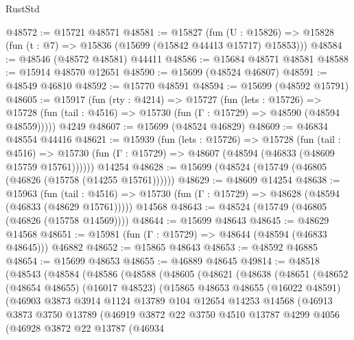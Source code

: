\begin{lexlean}{RustStd}
\begin{coremodule}
@48572 := @15721 @48571
@48581 := @15827
    (fun (U : @15826) => @15828 (fun (t : @7) => @15836 (@15699 (@15842 @44413 @15717) @15853)))
@48584 := @48546 (@48572 @48581) @44411
@48586 := @15684 @48571 @48581
@48588 := @15914 @48570 @12651
@48590 := @15699 (@48524 @46807)
@48591 := @48549 @46810
@48592 := @15770 @48591
@48594 := @15699 (@48592 @15791)
@48605 := @15917
    (fun (rty : @4214) =>
    @15727
      (fun (lets : @15726) =>
      @15728 (fun (tail : @4516) => @15730 (fun (Γ : @15729) => @48590 (@48594 @48559)))))
    @4249
@48607 := @15699 (@48524 @46829)
@48609 := @46834 @48554 @44416
@48621 := @15939
    (fun (lets : @15726) =>
    @15728
      (fun (tail : @4516) =>
      @15730 (fun (Γ : @15729) => @48607 (@48594 (@46833 (@48609 @15759 @15761))))))
    @14254
@48628 := @15699 (@48524 (@15749 (@46805 (@46826 (@15758 (@14255 @15761))))))
@48629 := @48609 @14254
@48638 := @15963
    (fun (tail : @4516) => @15730 (fun (Γ : @15729) => @48628 (@48594 (@46833 (@48629 @15761)))))
    @14568
@48643 := @48524 (@15749 (@46805 (@46826 (@15758 @14569))))
@48644 := @15699 @48643
@48645 := @48629 @14568
@48651 := @15981 (fun (Γ : @15729) => @48644 (@48594 (@46833 @48645))) @46882
@48652 := @15865 @48643
@48653 := @48592 @46885
@48654 := @15699 @48653
@48655 := @46889 @48645
@49814 := @48518
    (@48543
      (@48584
        (@48586
          (@48588
            (@48605
              (@48621
                (@48638
                  (@48651
                    (@48652
                      (@48654 @48655)
                      (@16017 @48523)
                      (@15865
                        @48653
                        @48655
                        (@16022 @48591)
                        (@46903
                          @3873
                          @3914
                          @1124
                          @13789
                          @104
                          @12654
                          @14253
                          @14568
                          (@46913
                            @3873
                            @3750
                            @13789
                            (@46919
                              @3872
                              @22
                              @3750
                              @4510
                              @13787
                              @4299
                              @4056
                              (@46928
                                @3872
                                @22
                                @13787
                                (@46934

\end{coremodule}
\end{lexlean}
